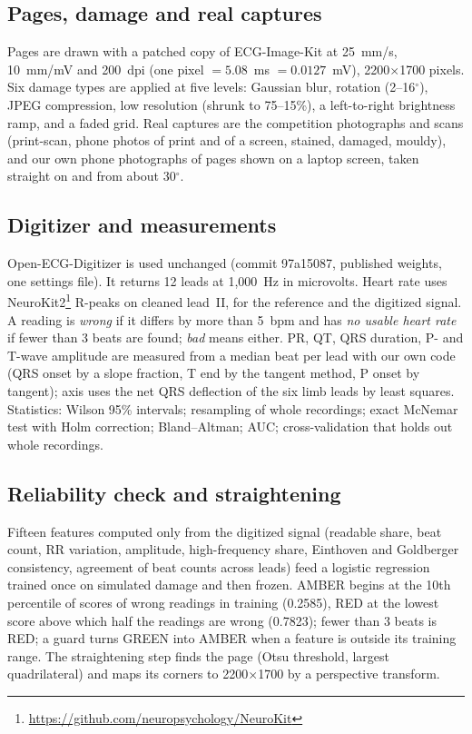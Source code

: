 \documentclass[conference]{IEEEtran}
\begin{document}
\subsection{Pages, damage and real captures}
Pages are drawn with a patched copy of ECG-Image-Kit \cite{ref1} at 25~mm/s, 10~mm/mV and 200~dpi (one pixel $=5.08$~ms $=0.0127$~mV), 2200$\times$1700 pixels. Six damage types are applied at five levels: Gaussian blur, rotation (2--16$^\circ$), JPEG compression, low resolution (shrunk to 75--15\%), a left-to-right brightness ramp, and a faded grid. Real captures are the competition photographs and scans (print-scan, phone photos of print and of a screen, stained, damaged, mouldy), and our own phone photographs of pages shown on a laptop screen, taken straight on and from about 30$^\circ$.

\subsection{Digitizer and measurements}
Open-ECG-Digitizer \cite{ref5} is used unchanged (commit 97a15087, published weights, one settings file). It returns 12 leads at 1{,}000~Hz in microvolts. Heart rate uses NeuroKit2\footnote{\url{https://github.com/neuropsychology/NeuroKit}} R-peaks on cleaned lead~II, for the reference and the digitized signal. A reading is \emph{wrong} if it differs by more than 5~bpm and has \emph{no usable heart rate} if fewer than 3 beats are found; \emph{bad} means either. PR, QT, QRS duration, P- and T-wave amplitude are measured from a median beat per lead with our own code (QRS onset by a slope fraction, T end by the tangent method, P onset by tangent); axis uses the net QRS deflection of the six limb leads by least squares. Statistics: Wilson 95\% intervals; resampling of whole recordings; exact McNemar test with Holm correction; Bland--Altman; AUC; cross-validation that holds out whole recordings.

\subsection{Reliability check and straightening}
Fifteen features computed only from the digitized signal (readable share, beat count, RR variation, amplitude, high-frequency share, Einthoven and Goldberger consistency, agreement of beat counts across leads) feed a logistic regression trained once on simulated damage and then frozen. AMBER begins at the 10th percentile of scores of wrong readings in training (0.2585), RED at the lowest score above which half the readings are wrong (0.7823); fewer than 3 beats is RED; a guard turns GREEN into AMBER when a feature is outside its training range. The straightening step finds the page (Otsu threshold, largest quadrilateral) and maps its corners to 2200$\times$1700 by a perspective transform.
\end{document}

